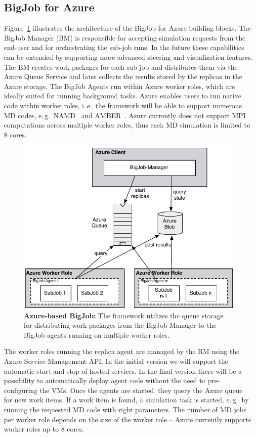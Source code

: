 \documentclass[conference,final]{IEEEtran}
\newcommand{\up}{\vspace*{-1em}}
\begin{document}
\subsection{BigJob for Azure}
\up

Figure~\ref{fig:figures_bigjob_azure} illustrates the architecture of the BigJob
for Azure building blocks. The BigJob Manager (BM) is responsible for accepting 
simulation requests from the end-user and for orchestrating the sub-job runs. 
In the future these capabilities can be extended by supporting more advanced steering and
visualization features. The BM creates work packages for each sub-job and 
distributes them via the Azure Queue Service and
later collects the results stored by the replicas in the Azure
storage.  The BigJob Agents run within Azure worker roles, which are
ideally suited for running background tasks. Azure enables users to
run native code within worker roles, i.\,e.\ the framework will be
able to support numerous MD codes, e.\,g.\ NAMD~\cite{Phillips:2005gd}
and AMBER~\cite{cheatham-5}.  Azure currently does not support MPI
computations across multiple worker roles, thus each MD
simulation is limited to 8 cores.



\begin{figure}
    \centering
    \includegraphics[width=.4\textwidth]{figures/bigjob_azure}
    \caption{\textbf{Azure-based BigJob:} The framework
      utilizes the queue storage for distributing work
      packages from the BigJob Manager to the
      BigJob agents running on multiple worker roles.}
    \label{fig:figures_bigjob_azure}
\end{figure}


The worker roles running the replica agent are managed by the RM using
the Azure Service Management API. In the initial version we will
support the automatic start and stop of hosted services. In the final
version there will be a possibility to automatically deploy agent code
without the need to pre-configuring the VMs. Once the agents are
started, they query the Azure queue for new work items. If a work item
is found, a simulation task is started, e.\,g.\ by running the requested
MD code with right parameters.  The number of
MD jobs per worker role depends on the size of the worker role --
Azure currently supports worker roles up to 8 cores.
\end{document}
